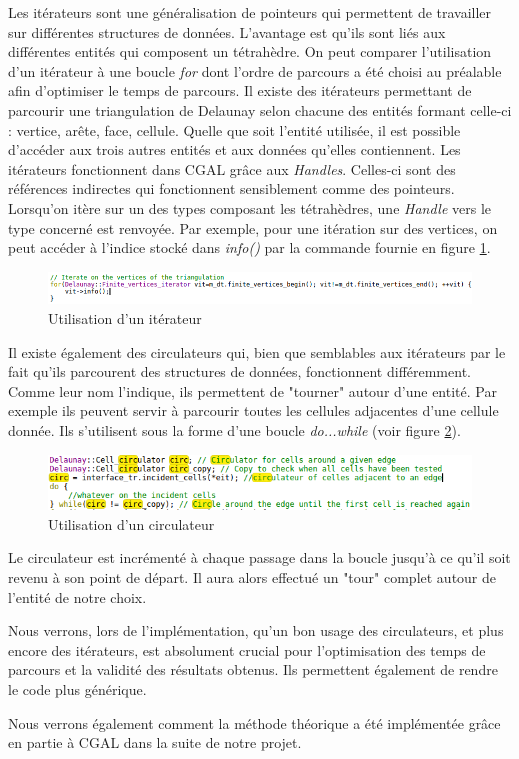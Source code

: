 Les itérateurs sont une généralisation de pointeurs qui permettent de travailler sur
différentes structures de données. L'avantage est qu'ils sont liés aux différentes entités
qui composent un tétrahèdre. On peut comparer l'utilisation d'un itérateur à une boucle
\textit{for} dont l'ordre de parcours a été choisi au préalable afin d'optimiser
le temps de parcours.
Il existe des itérateurs permettant de parcourir une triangulation de Delaunay
selon chacune des entités formant celle-ci : vertice, arête, face, cellule. Quelle
que soit l'entité utilisée, il est possible d'accéder aux trois autres entités et
aux données qu'elles contiennent. Les itérateurs fonctionnent dans CGAL grâce aux
\textit{Handles}. Celles-ci sont des références indirectes qui fonctionnent sensiblement
comme des pointeurs. Lorsqu'on itère sur un des types composant les tétrahèdres, une
\textit{Handle} vers le type concerné est renvoyée. Par exemple, pour une itération sur des
vertices, on peut accéder à l'indice stocké dans \textit{info()} par la commande
fournie en figure \ref{fig::access_it}.

\begin{figure}[ht]
\centering
  \includegraphics[width=\textwidth]{figures/access_it.png}
  \caption{Utilisation d'un itérateur}
  \label{fig::access_it}
\end{figure}


Il existe également des circulateurs qui, bien que semblables aux itérateurs par le fait
qu'ils parcourent des structures de données, fonctionnent différemment. Comme leur nom
l'indique, ils permettent de "tourner" autour d'une entité. Par exemple ils peuvent
servir à parcourir toutes les cellules adjacentes d'une cellule donnée. Ils s'utilisent
sous la forme d'une boucle \textit{do...while} (voir figure \ref{fig::circ_ex}).
\begin{figure}[ht]
\centering
  \includegraphics[width=\textwidth]{figures/circ_ex.png}
  \caption{Utilisation d'un circulateur}
  \label{fig::circ_ex}
\end{figure}
 Le circulateur est incrémenté à chaque
passage dans la boucle jusqu'à ce qu'il soit revenu à son point de départ. Il aura alors
effectué un "tour" complet autour de l'entité de notre choix.


Nous verrons, lors de l'implémentation, qu'un bon usage des circulateurs, et plus encore des itérateurs,
est absolument crucial pour l'optimisation des temps de parcours et la validité
des résultats obtenus. Ils permettent également de rendre le code plus générique.

Nous verrons également comment la méthode théorique a été implémentée grâce en partie à CGAL
dans la suite de notre projet.
